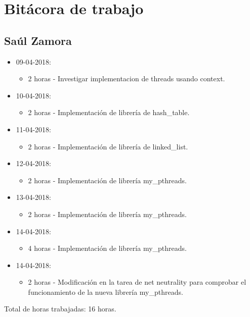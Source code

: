 \documentclass{article}
\begin{document}
\section{Bit\'acora de trabajo}
\subsection{Sa\'ul Zamora}
\begin{itemize}
  \item 09-04-2018:
  \begin{itemize}
    \item 2 horas - Investigar implementacion de threads usando context.
  \end{itemize}
  \item 10-04-2018:
  \begin{itemize}
    \item 2 horas - Implementaci\'on de librer\'ia de hash\_table.
  \end{itemize}
  \item 11-04-2018:
  \begin{itemize}
    \item 2 horas - Implementaci\'on de librer\'ia de linked\_list.
  \end{itemize}
  \item 12-04-2018:
  \begin{itemize}
    \item 2 horas - Implementaci\'on de librer\'ia my\_pthreads.
  \end{itemize}
  \item 13-04-2018:
  \begin{itemize}
    \item 2 horas - Implementaci\'on de librer\'ia my\_pthreads.
  \end{itemize}
  \item 14-04-2018:
  \begin{itemize}
    \item 4 horas - Implementaci\'on de librer\'ia my\_pthreads.
  \end{itemize}
  \item 14-04-2018:
  \begin{itemize}
    \item 2 horas - Modificaci\'on en la tarea de net neutrality para comprobar el funcionamiento de la nueva librer\'ia my\_pthreads.
  \end{itemize}
\end{itemize}
Total de horas trabajadas: 16 horas.
\end{document}
